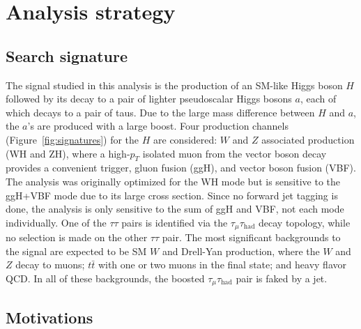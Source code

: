 \chapter{Analysis strategy\label{sec:strategy}}

\section{Search signature\label{sec:signature}}
The signal studied in this analysis is the production of an SM-like Higgs boson $H$ followed by its decay to a pair of lighter pseudoscalar Higgs bosons $a$, each of which decays to a pair of taus. Due to the large mass difference between $H$ and $a$, the $a$'s are produced with a large boost. Four production channels (Figure~\ref{fig:signatures}) for the $H$ are considered: $W$ and $Z$ associated production (WH and ZH), where a high-$p_T$ isolated muon from the vector boson decay provides a convenient trigger, gluon fusion (ggH), and vector boson fusion (VBF). The analysis was originally optimized for the WH mode but is sensitive to the ggH+VBF mode due to its large cross section. Since no forward jet tagging is done, the analysis is only sensitive to the sum of ggH and VBF, not each mode individually.  One of the $\tau\tau$ pairs is identified via the $\tau_{\mu}\tau_{\text{had}}$ decay topology, while no selection is made on the other $\tau\tau$ pair. The most significant backgrounds to the signal are expected to be SM $W$ and Drell-Yan production, where the $W$ and $Z$ decay to muons; $t\bar{t}$ with one or two muons in the final state; and heavy flavor QCD. In all of these backgrounds, the boosted $\tau_{\mu}\tau_{\text{had}}$ pair is faked by a jet.

\section{Motivations\label{sec:motivations}}

